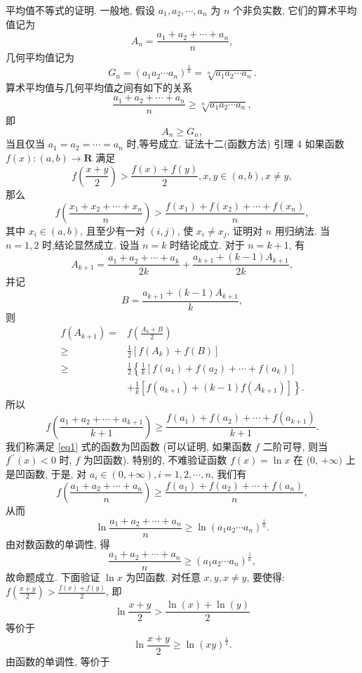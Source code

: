 平均值不等式的证明.
一般地, 假设 $a_1, a_2, \cdots, a_n$ 为 $n$ 个非负实数, 它们的算术平均值记为
$$
A_n=\frac{a_1+a_2+\cdots+a_n}{n},
$$
几何平均值记为
$$
G_n=\left(a_1 a_2 \cdots a_n\right)^{\frac{1}{n}}=\sqrt[n]{a_1 a_2 \cdots a_n} .
$$
算术平均值与几何平均值之间有如下的关系
$$
\frac{a_1+a_2+\cdots+a_n}{n} \geqslant \sqrt[n]{a_1 a_2 \cdots a_n},
$$
即
$$
A_n \geqslant G_n,
$$
当且仅当 $a_1=a_2=\cdots=a_n$ 时,等号成立.
证法十二(函数方法)
引理 4 如果函数 $f(x):(a, b) \rightarrow \mathbf{R}$ 满足
$$
f\left(\frac{x+y}{2}\right)>\frac{f(x)+f(y)}{2}, x, y \in(a, b), x \neq y, \label{eq1}
$$
那么
$$
f\left(\frac{x_1+x_2+\cdots+x_n}{n}\right)>\frac{f\left(x_1\right)+f\left(x_2\right)+\cdots+f\left(x_n\right)}{n}, \label{eq2}
$$
其中 $x_i \in(a, b)$, 且至少有一对 $(i, j)$, 使 $x_i \neq x_j$.
证明对 $n$ 用归纳法.
当 $n=1,2$ 时,结论显然成立.
设当 $n=k$ 时结论成立.
对于 $n=k+1$, 有
$$
A_{k+1}=\frac{a_1+a_2+\cdots+a_k}{2 k}+\frac{a_{k+1}+(k-1) A_{k+1}}{2 k},
$$
并记
$$
B=\frac{a_{k+1}+(k-1) A_{k+1}}{k},
$$
则
$$
\begin{aligned}
f\left(A_{k+1}\right)= & f\left(\frac{A_k+B}{2}\right) \\
\geqslant & \frac{1}{2}\left[f\left(A_k\right)+f(B)\right] \\
\geqslant & \frac{1}{2}\left\{\frac{1}{k}\left[f\left(a_1\right)+f\left(a_2\right)+\cdots+f\left(a_k\right)\right]\right. \\
& \left.+\frac{1}{k}\left[f\left(a_{k+1}\right)+(k-1) f\left(A_{k+1}\right)\right]\right\} .
\end{aligned}
$$
所以
$$
f\left(\frac{a_1+a_2+\cdots+a_{k+1}}{k+1}\right) \geqslant \frac{f\left(a_1\right)+f\left(a_2\right)+\cdots+f\left(a_{k+1}\right)}{k+1} .
$$
我们称满足 \ref{eq1} 式的函数为凹函数 (可以证明, 如果函数 $f$ 二阶可导, 则当 $f^{\prime \prime}(x)<0$ 时, $f$ 为凹函数). 特别的, 不难验证函数 $f(x)=\ln x$ 在 (0, $+\infty)$ 上是凹函数, 于是, 对 $a_i \in(0,+\infty), i=1,2, \cdots, n$, 我们有
$$
f\left(\frac{a_1+a_2+\cdots+a_n}{n}\right) \geqslant \frac{f\left(a_1\right)+f\left(a_2\right)+\cdots+f\left(a_n\right)}{n},
$$
从而
$$
\ln \frac{a_1+a_2+\cdots+a_n}{n} \geqslant \ln \left(a_1 a_2 \cdots a_n\right)^{\frac{1}{n}} .
$$
由对数函数的单调性, 得
$$
\frac{a_1+a_2+\cdots+a_n}{n} \geqslant\left(a_1 a_2 \cdots a_n\right)^{\frac{1}{n}},
$$
故命题成立.
下面验证 $\ln x$ 为凹函数.
对任意 $x, y, x \neq y$, 要使得: $f\left(\frac{x+y}{2}\right)> \frac{f(x)+f(y)}{2}$, 即
$$
\ln \frac{x+y}{2}>\frac{\ln (x)+\ln (y)}{2}
$$
等价于
$$
\ln \frac{x+y}{2} \geqslant \ln (x y)^{\frac{1}{2}} .
$$
由函数的单调性, 等价于
